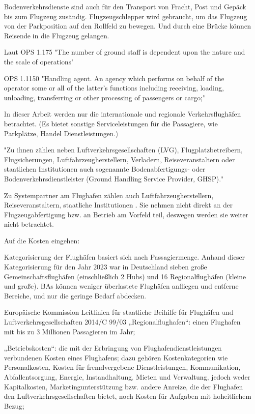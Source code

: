 Bodenverkehrsdienste sind auch für den Transport von Fracht, Post und Gepäck bis zum Flugzeug zusändig. \cite{mensen2013handbuch}
Flugzeugschlepper wird gebraucht, um das Flugzeug von der Parkposition auf den Rollfeld zu bewegen. Und durch eine Brücke können Reisende 
in die Flugzeug gelangen.

Laut OPS 1.175 "The number of ground staff is dependent upon the nature and the scale of operations"

OPS 1.1150 "Handling agent. An agency which performs on behalf of the operator some or all of the latter's functions
including receiving, loading, unloading, transferring or other processing of passengers or cargo;"


In dieser Arbeit werden nur die internationale und regionale Verkehrsflughäfen betrachtet. 
(Es bietet sonstige Serviceleistungen für die Passagiere, wie Parkplätze, Handel Dienstleistungen.)

"Zu ihnen zählen neben Luftverkehrsgesellschaften (LVG), Flugplatzbetreibern, Flugsicherungen, Luftfahrzeugherstellern,
Verladern, Reiseveranstaltern oder staatlichen
Institutionen auch sogenannte Bodenabfertigungs- oder Bodenverkehrsdienstleister
(Ground Handling Service Provider, GHSP)." 

Zu Systempartner am Flughafen zählen auch Luftfahrzeugherstellern, Reiseveranstaltern, staatliche Institutionen \cite{maertens2023neue}. 
Sie nehmen nicht direkt an der Flugzeugabfertigung bzw. an Betrieb am Vorfeld teil, deswegen werden sie weiter nicht betrachtet.


Auf die Kosten eingehen:

Kategorisierung der Flughäfen basiert sich nach Passagiermenge. Anhand dieser Kategorisierung für den Jahr 2023 war in Deutschland 
sieben große Gemeinschaftsflughäfen (einschließlich 2 Hubs) und 16 Regionalflughäfen (kleine und große). 
BAs können weniger überlastete Flughäfen anfliegen und entferne Bereiche, und
nur die geringe Bedarf abdecken.



Europäische Kommission Leitlinien für staatliche Beihilfe für Flughäfen und Luftverkehrsgesellschaften 2014/C 99/03
„Regionalflughafen“: einen Flughafen mit bis zu 3 Millionen Passagieren im Jahr;

„Betriebskosten“: die mit der Erbringung von Flughafendienstleistungen verbundenen Kosten eines Flughafens;
 dazu gehören Kostenkategorien wie Personalkosten, Kosten für fremdvergebene Dienstleistungen, Kommunikation, 
 Abfallentsorgung, Energie, Instandhaltung, Mieten und Verwaltung, jedoch weder Kapitalkosten, Marketingunterstützung 
 bzw. andere Anreize, die der Flughafen den Luftverkehrsgesellschaften bietet, noch Kosten für Aufgaben mit hoheitlichem Bezug;


